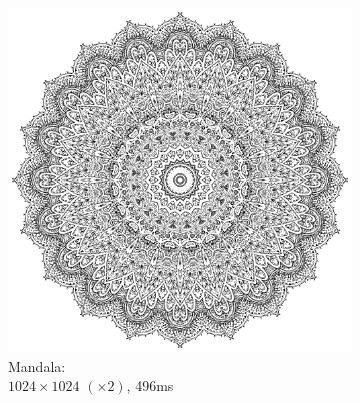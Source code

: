\documentclass[UTF8]{ctexart}
\begin{document}
\begin{figure}[H]
    \ContinuedFloat
    \centering
    \begin{subfigure}[b]{0.6\textwidth}
        \centering
        \includegraphics[width=\textwidth]{images/Mandala-1024x1024-x2-496ms.png}
        \caption{Mandala: \\$1024 \times 1024$ $(\times 2)$, 496ms}
    \end{subfigure}
    \hfill
    \begin{subfigure}[b]{0.3\textwidth}
        \centering

\end{subfigure}
\end{figure}
\end{document}
